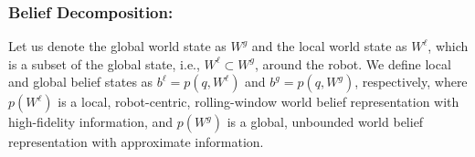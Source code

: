 \documentclass[letterpaper]{article} %
\newcommand{\ph}[1]{{\textbf{#1}:}} %
\begin{document}



%
\subsubsection{Belief Decomposition:} \hfill
\vspace{-0.25pt}

\noindent
Let us denote the global world state as $W^g$ and the local world state as $W^\ell$, which is a subset of the global state, i.e., $W^\ell \subset W^g$, around the robot.
We define local and global belief states as $b^\ell = p(q, W^\ell)$ and $b^g = p(q, W^g)$, respectively, where $p(W^\ell)$ is a local, robot-centric, rolling-window world belief representation with high-fidelity information, and $p(W^g)$ is a global, unbounded world belief representation with approximate information.
\end{document}
